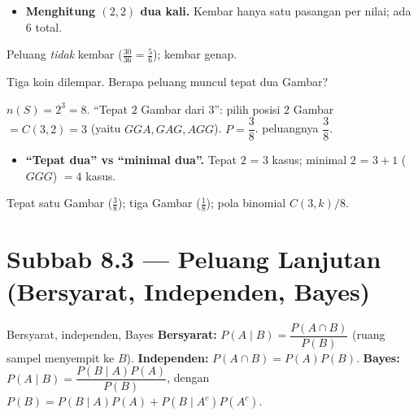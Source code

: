 \begin{jebakan}
\begin{itemize}[leftmargin=*,topsep=2pt]
  \item \textbf{Menghitung $(2,2)$ dua kali.} Kembar hanya satu pasangan per
  nilai; ada $6$ total.
\end{itemize}
\end{jebakan}

\begin{variasi}
Peluang \emph{tidak} kembar ($\frac{30}{36}=\frac56$); kembar genap.
\end{variasi}

\begin{soalbox}{}
Tiga koin dilempar. Berapa peluang muncul tepat dua Gambar?
\end{soalbox}

\jawab
{} $n(S)=2^3=8$.
 ``Tepat $2$ Gambar dari $3$'': pilih posisi $2$ Gambar $=C(3,2)=3$
(yaitu $GGA,GAG,AGG$).
 $P=\dfrac{3}{8}$.
\jadi peluangnya $\dfrac38$.

\begin{jebakan}
\begin{itemize}[leftmargin=*,topsep=2pt]
  \item \textbf{``Tepat dua'' vs ``minimal dua''.} Tepat $2$ = $3$ kasus;
  minimal $2$ = $3+1$ ($GGG$) $=4$ kasus.
\end{itemize}
\end{jebakan}

\begin{variasi}
Tepat satu Gambar ($\frac38$); tiga Gambar ($\frac18$); pola binomial $C(3,k)/8$.
\end{variasi}

\section*{Subbab 8.3 — Peluang Lanjutan (Bersyarat, Independen, Bayes)}

\begin{ingat}{Bersyarat, independen, Bayes}
\textbf{Bersyarat:} $P(A\mid B)=\dfrac{P(A\cap B)}{P(B)}$ (ruang sampel
menyempit ke $B$). \textbf{Independen:} $P(A\cap B)=P(A)P(B)$. \textbf{Bayes:}
$P(A\mid B)=\dfrac{P(B\mid A)P(A)}{P(B)}$, dengan
$P(B)=P(B\mid A)P(A)+P(B\mid A^c)P(A^c)$.
\end{ingat}

